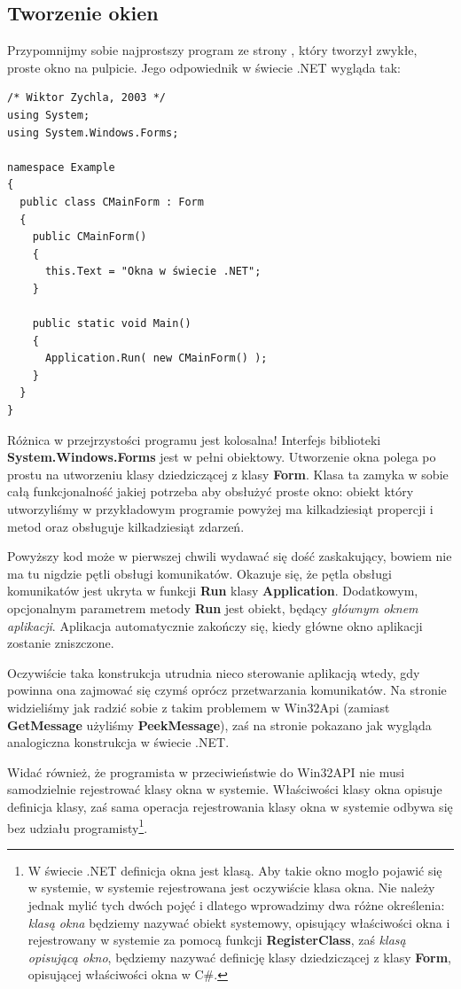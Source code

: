 ﻿\subsection{Tworzenie okien}
\label{netTworzenieOkien}

Przypomnijmy sobie najprostszy program ze strony \pageref{tworzenieOkienAPI}, który tworzył zwykłe, 
proste okno na pulpicie. Jego odpowiednik w świecie .NET wygląda tak:

\begin{scriptsize}
\begin{verbatim}
/* Wiktor Zychla, 2003 */
using System;
using System.Windows.Forms;

namespace Example
{
  public class CMainForm : Form
  {   
    public CMainForm()
    {
      this.Text = "Okna w świecie .NET"; 
    }

    public static void Main()
    {
      Application.Run( new CMainForm() );
    }
  }
}
\end{verbatim}
\end{scriptsize}

Różnica w przejrzystości programu jest kolosalna! Interfejs biblioteki {\bf System.Windows.Forms} jest
w pełni obiektowy. Utworzenie okna polega po prostu na utworzeniu klasy dziedziczącej z klasy
{\bf Form}. Klasa ta zamyka w sobie całą funkcjonalność jakiej potrzeba aby obsłużyć proste okno: obiekt
który utworzyliśmy w przykładowym programie powyżej ma kilkadziesiąt propercji i metod oraz obsługuje
kilkadziesiąt zdarzeń.

Powyższy kod może w pierwszej chwili wydawać się dość zaskakujący, bowiem nie ma tu nigdzie
pętli obsługi komunikatów. Okazuje się, że pętla obsługi komunikatów jest ukryta w funkcji
{\bf Run} klasy {\bf Application}. Dodatkowym, opcjonalnym parametrem metody {\bf Run} jest
obiekt, będący {\em głównym oknem aplikacji}. Aplikacja automatycznie zakończy się, kiedy główne
okno aplikacji zostanie zniszczone.

Oczywiście taka konstrukcja utrudnia nieco sterowanie aplikacją wtedy, gdy powinna ona
zajmować się czymś oprócz przetwarzania komunikatów. 
Na stronie \pageref{apiPetlaObslugiKomunikatow} widzieliśmy jak radzić sobie z takim problemem w Win32Api
(zamiast {\bf GetMessage} użyliśmy {\bf PeekMessage}),
zaś na stronie \pageref{netPetlaObslugiKomunikatow} pokazano jak wygląda analogiczna konstrukcja
w świecie .NET.

Widać również, że programista w przeciwieństwie do Win32API nie musi samodzielnie 
rejestrować klasy okna w systemie. Właściwości klasy okna opisuje definicja klasy, zaś sama operacja
rejestrowania klasy okna w systemie odbywa się bez udziału programisty\footnote{W świecie
.NET definicja okna jest klasą. Aby takie okno mogło pojawić się w systemie, w systemie rejestrowana jest
oczywiście klasa okna. Nie należy jednak mylić tych dwóch pojęć i dlatego wprowadzimy dwa różne określenia:
{\em klasą okna} będziemy nazywać obiekt systemowy, opisujący właściwości okna i rejestrowany w systemie
za pomocą funkcji {\bf RegisterClass}, zaś {\em klasą opisującą okno}, będziemy nazywać definicję
klasy dziedziczącej z klasy {\bf Form}, opisującej właściwości okna w C\#.}.

